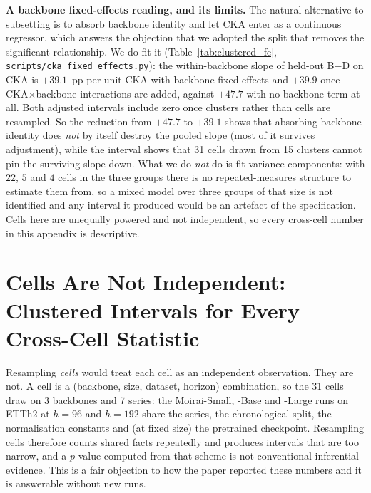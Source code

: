 \textbf{A backbone fixed-effects reading, and its limits.} The natural
alternative to subsetting is to absorb backbone identity and let CKA enter as a
continuous regressor, which answers the objection that we adopted the split that
removes the significant relationship. We do fit it
(Table~\ref{tab:clustered_fe}, \texttt{scripts/cka\_fixed\_effects.py}): the
within-backbone slope of held-out B$-$D on CKA is $+39.1$~pp per unit CKA with
backbone fixed effects and $+39.9$ once CKA${\times}$backbone interactions are
added, against $+47.7$ with no backbone term at all. Both adjusted intervals
include zero once clusters rather than cells are resampled. So the reduction from
$+47.7$ to $+39.1$ shows that absorbing backbone identity does \emph{not} by
itself destroy the pooled slope (most of it survives adjustment), while the
interval shows that 31 cells drawn from 15 clusters cannot pin the surviving
slope down. What we do \emph{not} do is fit variance components: with $22$, $5$
and $4$ cells in the three groups there is no repeated-measures structure to
estimate them from, so a mixed model over three groups of that size is not
identified and any interval it produced would be an artefact of the
specification. Cells here are unequally powered and not independent, so every
cross-cell number in this appendix is descriptive.

\section{Cells Are Not Independent: Clustered Intervals for Every Cross-Cell Statistic}
\label{app:clustered}

Resampling \emph{cells} would treat each cell as an independent observation.
They are not. A cell is a (backbone, size, dataset,
horizon) combination, so the 31 cells draw on 3 backbones and 7 series: the
Moirai-Small, -Base and -Large runs on ETTh2 at $h{=}96$ and $h{=}192$ share the
series, the chronological split, the normalisation constants and (at fixed
size) the pretrained checkpoint. Resampling cells therefore counts shared facts
repeatedly and produces intervals that are too narrow, and a $p$-value computed
from that scheme is not conventional inferential evidence. This is a fair
objection to how the paper reported these numbers and it is answerable without
new runs.

